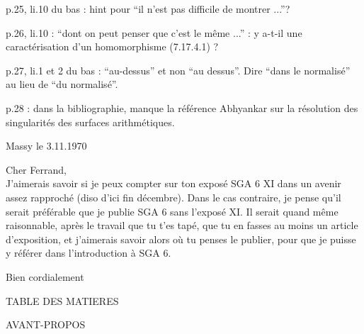 
p.25, li.10 du bas : hint pour ``il n'est pas difficile de montrer ...''?

p.26, li.10 : ``dont on peut penser que c'est le même ...'' : y a-t-il  une caractérisation d'un homomorphisme (7.17.4.1) ? 

p.27, li.1 et 2 du bas : ``au-dessus'' et non ``au dessus''. Dire ``dans le normalisé'' au lieu de ``du normalisé''.

p.28 : dans la bibliographie, manque la référence Abhyankar sur la résolution des singularités des surfaces arithmétiques.



\begin{flushright}
Massy le 3.11.1970\\
\end{flushright}

\noindent Cher Ferrand,\\

J'aimerais savoir si je peux compter sur ton exposé SGA 6 XI dans un avenir assez rapproché (diso d'ici fin décembre). Dans le cas contraire, je pense qu'il serait préférable que je publie SGA 6 sans l'exposé XI. Il serait quand même raisonnable, après le travail que tu t'es tapé, que tu en fasses au moins un article d'exposition, et j'aimerais savoir alors où tu penses le publier, pour que je puisse y référer dans l'introduction à SGA 6.

Bien cordialement\\


\begin{center}
TABLE DES MATIERES
\end{center}

\noindent AVANT-PROPOS \dotfill

